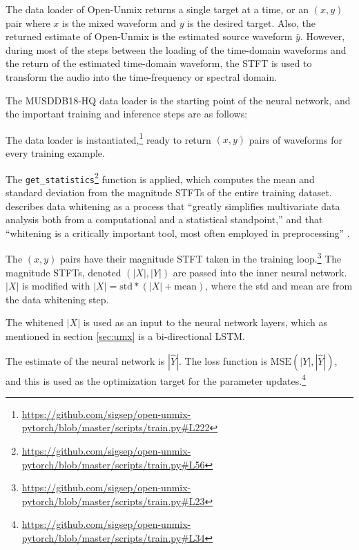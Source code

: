 \documentclass[report.tex]{subfiles}
\begin{document}

The data loader of Open-Unmix returns a single target at a time, or an $(x, y)$ pair where $x$ is the mixed waveform and $y$ is the desired target. Also, the returned estimate of Open-Unmix is the estimated source waveform $\hat{y}$. However, during most of the steps between the loading of the time-domain waveforms and the return of the estimated time-domain waveform, the STFT is used to transform the audio into the time-frequency or spectral domain.

The MUSDDB18-HQ data loader is the starting point of the neural network, and the important training and inference steps are as follows:

\begin{tight_enumerate}
	\item
		The data loader is instantiated,\footnote{\url{https://github.com/sigsep/open-unmix-pytorch/blob/master/scripts/train.py\#L222}} ready to return $(x, y)$ pairs of waveforms for every training example.
	\item
		The \Verb#get_statistics#\footnote{\url{https://github.com/sigsep/open-unmix-pytorch/blob/master/scripts/train.py\#L56}} function is applied, which computes the mean and standard deviation from the magnitude STFTs of the entire training dataset. \citeauthor{Kessy_2018} describes data whitening as a process that ``greatly simplifies multivariate data analysis both from a computational and a statistical standpoint,'' and that ``whitening is a critically important tool, most often employed in preprocessing'' \parencite[309]{Kessy_2018}.
	\item
		The $(x, y)$ pairs have their magnitude STFT taken in the training loop.\footnote{\url{https://github.com/sigsep/open-unmix-pytorch/blob/master/scripts/train.py\#L23}} The magnitude STFTs, denoted $(|X|, |Y|)$ are passed into the inner neural network. $|X|$ is modified with $|X| = \text{std}*(|X|+\text{mean})$, where the std and mean are from the data whitening step.
	\item
		The whitened $|X|$ is used as an input to the neural network layers, which as mentioned in section \ref{sec:umx} is a bi-directional LSTM.
	\item
		The estimate of the neural network is $|\hat{Y}|$. The loss function is $\text{MSE}(|Y|, |\hat{Y}|)$, and this is used as the optimization target for the parameter updates.\footnote{\url{https://github.com/sigsep/open-unmix-pytorch/blob/master/scripts/train.py\#L34}}

\end{tight_enumerate}
\end{document}
